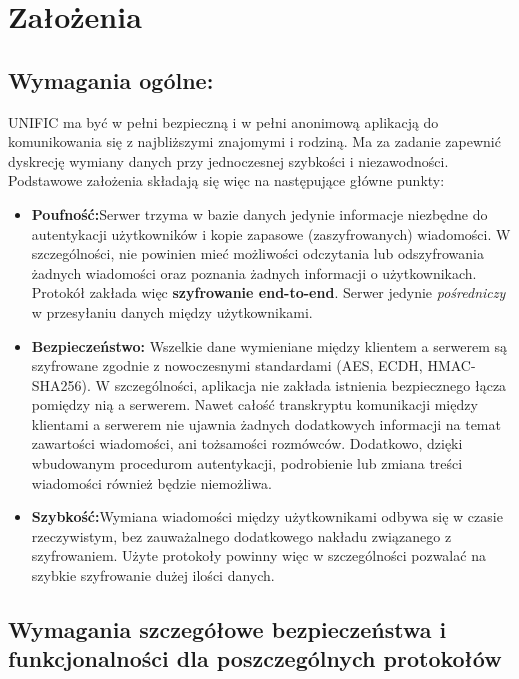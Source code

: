 \documentclass{article}
\begin{document}
\clearpage

\tableofcontents
\clearpage

\section{Założenia}

\subsection{Wymagania ogólne:}

UNIFIC ma być w pełni bezpieczną i w pełni anonimową aplikacją do komunikowania się z najbliższymi
znajomymi i rodziną. Ma za zadanie zapewnić dyskrecję wymiany danych przy jednoczesnej szybkości
i niezawodności. Podstawowe założenia składają się więc na następujące główne punkty:

\begin{itemize}
\item \textbf{{\large P}oufność:}\quad Serwer trzyma w bazie danych jedynie informacje niezbędne do
autentykacji użytkowników i kopie zapasowe (zaszyfrowanych) wiadomości. W szczególności, nie powinien mieć
możliwości odczytania lub odszyfrowania żadnych wiadomości oraz poznania żadnych informacji o użytkownikach. 
Protokół zakłada więc \textbf{szyfrowanie end-to-end}. Serwer jedynie \emph{pośredniczy} w przesyłaniu danych między
użytkownikami.

\item \textbf{{\large B}ezpieczeństwo:} \quad Wszelkie dane wymieniane między klientem a serwerem są szyfrowane
zgodnie z nowoczesnymi standardami (AES, ECDH, HMAC-SHA256). W szczególności, aplikacja nie zakłada istnienia
bezpiecznego łącza pomiędzy nią a serwerem. Nawet całość transkryptu komunikacji między klientami a 
serwerem nie ujawnia żadnych dodatkowych informacji na temat zawartości wiadomości, ani tożsamości rozmówców.
Dodatkowo, dzięki wbudowanym procedurom autentykacji, podrobienie lub zmiana treści wiadomości również
będzie niemożliwa.

\item \textbf{{\large S}zybkość:}\quad Wymiana wiadomości między użytkownikami odbywa się w czasie rzeczywistym,
bez zauważalnego dodatkowego nakładu związanego z szyfrowaniem. Użyte protokoły powinny więc w szczególności
pozwalać na szybkie szyfrowanie dużej ilości danych.
\end{itemize} 

\subsection{Wymagania szczegółowe bezpieczeństwa i funkcjonalności dla poszczególnych protokołów}
\end{document}
